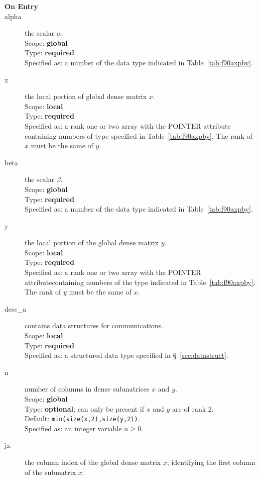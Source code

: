 \begin{description}
\item[\bf On Entry]
\item[alpha] the scalar $\alpha$.\\
Scope: {\bf global} \\
Type: {\bf required} \\
Specified as: a number of the data type indicated in Table~\ref{tab:f90axpby}.
\item[x] the local portion of global dense matrix
$x$.\\
Scope: {\bf local} \\
Type: {\bf required} \\
Specified as: a rank one or two array with the POINTER attribute
containing numbers of type 
specified in Table~\ref{tab:f90axpby}.  The rank of $x$ must be the same of $y$. 
\item[beta] the scalar $\beta$.\\
Scope: {\bf global} \\
Type: {\bf required} \\
Specified as: a number of the data type indicated in Table~\ref{tab:f90axpby}.
\item[y] the local portion of the global dense matrix
$y$. \\
Scope: {\bf local} \\
Type: {\bf required} \\
Specified as:  a rank one or two array with the POINTER
attributecontaining numbers of the type 
indicated in Table~\ref{tab:f90axpby}.  The rank of $y$ must be the same of $x$. 
\item[desc\_a] contains data structures for communications.\\
Scope: {\bf local} \\
Type: {\bf required}\\
Specified as: a structured data type specified in \S~\ref{sec:datastruct}.
\item[n] number of columns in dense submatrices $x$ and $y$.\\
Scope: {\bf global} \\
Type: {\bf optional}; can only be present if $x$ and $y$ are of rank 2.\\
Default: \verb|min(size(x,2),size(y,2))|.\\
Specified as: an integer variable $n\ge 0$.
\item[jx]  the column index of the global dense matrix $x$,
identifying the first column of the submatrix $x$.\\

\end{description}
